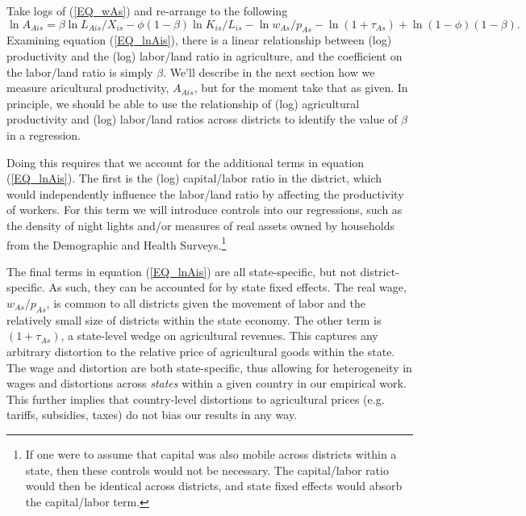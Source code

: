 \documentclass[11pt]{article}
\begin{document}
Take logs of (\ref{EQ_wAs}) and re-arrange to the following
\begin{equation}
	\ln A_{Ais} = \beta \ln L_{Ais}/X_{is} - \phi(1-\beta) \ln K_{is}/L_{is} - \ln w_{As}/p_{As} - \ln (1+\tau_{As}) + \ln (1-\phi)(1-\beta). \label{EQ_lnAis}
\end{equation}
Examining equation (\ref{EQ_lnAis}), there is a linear relationship between (log) productivity and the (log) labor/land ratio in agriculture, and the coefficient on the labor/land ratio is simply $\beta$. We'll describe in the next section how we measure aricultural productivity, $A_{Ais}$, but for the moment take that as given. In principle, we should be able to use the relationship of (log) agricultural productivity and (log) labor/land ratios across districts to identify the value of $\beta$ in a regression.

Doing this requires that we account for the additional terms in equation (\ref{EQ_lnAis}). The first is the (log) capital/labor ratio in the district, which would independently influence the labor/land ratio by affecting the productivity of workers. For this term we will introduce controls into our regressions, such as the density of night lights and/or measures of real assets owned by households from the Demographic and Health Surveys.\footnote{If one were to assume that capital was also mobile across districts within a state, then these controls would not be necessary. The capital/labor ratio would then be identical across districts, and state fixed effects would absorb the capital/labor term.}

The final terms in equation (\ref{EQ_lnAis}) are all state-specific, but not district-specific. As such, they can be accounted for by state fixed effects. The real wage, $w_{As}/p_{As}$, is common to all districts given the movement of labor and the relatively small size of districts within the state economy. The other term is $(1+\tau_{As})$, a state-level wedge on agricultural revenues. This captures any arbitrary distortion to the relative price of agricultural goods within the state. The wage and distortion are both state-specific, thus allowing for heterogeneity in wages and distortions across \textit{states} within a given country in our empirical work. This further implies that country-level distortions to agricultural prices (e.g. tariffs, subsidies, taxes) do not bias our results in any way.
\end{document}
